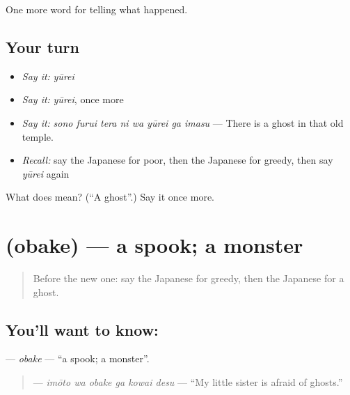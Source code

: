 \begin{grammarlens}[title={What you've built}]
One more word for telling what happened.
\end{grammarlens}

\subsection*{Your turn}
\begin{itemize}
\raggedright
  \item \emph{Say it:} \emph{yūrei}
  \item \emph{Say it:} \emph{yūrei}, once more
  \item \emph{Say it:} \emph{sono furui tera ni wa yūrei ga imasu} — There is a ghost in that old temple.
  \item \emph{Recall:} say the Japanese for poor, then the Japanese for greedy, then say \emph{yūrei} again
\end{itemize}

\begin{tcolorbox}[breakable,colback=teal!4,colframe=teal!35!black,title={Before you move on}]
What does  mean? (\textquotedblleft{}A ghost\textquotedblright{}.) Say it once more.
\end{tcolorbox}
\section[\texorpdfstring{\ja{おばけ} (obake)}{おばけ (obake)}]{ (obake) — a spook; a monster}

\label{lesson:JA-C302-obake}



\begin{quote}
Before the new one: say the Japanese for greedy, then the Japanese for a ghost.
\end{quote}

\subsection*{You'll want to know: }
\textbf{} — \emph{obake} — \textquotedblleft{}a spook; a monster\textquotedblright{}.

\begin{quote}
\textbf{  } — \emph{imōto wa obake ga kowai desu} — \textquotedblleft{}My little sister is afraid of ghosts.\textquotedblright{}
\end{quote}

